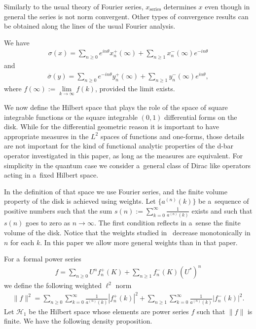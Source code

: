 \documentclass[pdftex]{sigma}
\numberwithin{equation}{section}
\begin{document}
Similarly to the usual theory of Fourier series, $x_\textrm{series}$ determines $x$ even though in general the series is
not norm convergent.
Other types of convergence results can be obtained along the lines of the usual Fourier analysis.

We have
\begin{gather}
\label{lim_at_infty1}
\sigma(x) = \sum\limits_{n\ge0} e^{in\theta}x_n^+(\infty) + \sum\limits_{n\ge1} x_n^-(\infty)e^{-in\theta}
\end{gather}
and
\begin{gather}
\label{lim_at_infty2}
\overline{\sigma}(y) = \sum\limits_{n\ge0} e^{-in\theta} y_n^+(\infty) + \sum\limits_{n\ge1} y_n^-(\infty)e^{in\theta},
\end{gather}
where $f(\infty):=\lim\limits_{k\to\infty}f(k)$, provided the limit exists.

We now def\/ine the Hilbert space that plays the role of the space of square integrable functions or the square integrable
$(0,1)$ dif\/ferential forms on the disk.
While for the dif\/ferential geometric reason it is important to have appropriate measures in the $L^2$ spaces of
functions and one-forms, those details are not important for the kind of functional analytic properties of the d-bar
operator investigated in this paper, as long as the measures are equivalent.
For simplicity in the quantum case we consider a~general class of Dirac like operators acting in a~f\/ixed Hilbert space.

In the def\/inition of that space we use Fourier series, and the f\/inite volume property of the disk is achieved using
weights.
Let $\{a^{(n)}(k)\}$ be a~sequence of positive numbers such that the sum $s(n):=\sum\limits_{k=0}^\infty
\frac{1}{a^{(n)}(k)}$ exists and such that $s(n)$ goes to zero as $n\to\infty$.
The f\/irst condition ref\/lects in a~sense the f\/inite volume of the disk.
Notice that the weights studied in~\cite{KM1} decrease monotonically in $n$ for each $k$.
In this paper we allow more general weights than in that paper.

For a~formal power series
\begin{gather*}
f = \sum\limits_{n\ge0} U^n f_n^+(K) + \sum\limits_{n\ge1} f_n^-(K)(U^*)^n
\end{gather*}
we def\/ine the following weighted $\ell^2$ norm
\begin{gather*}
\|f\|^2 = \sum\limits_{n\ge 0} \sum\limits_{k=0}^\infty \frac{1}{a^{(n)}(k)}|f_n^+(k)|^2 +
\sum\limits_{n\ge1}\sum\limits_{k=0}^\infty \frac{1}{a^{(n)}(k)}|f_n^-(k)|^2.
\end{gather*}
Let $\mathcal{H}_1$ be the Hilbert space whose elements are power series $f$ such that $\|f\|$ is f\/inite.
We have the following density proposition.
\end{document}
